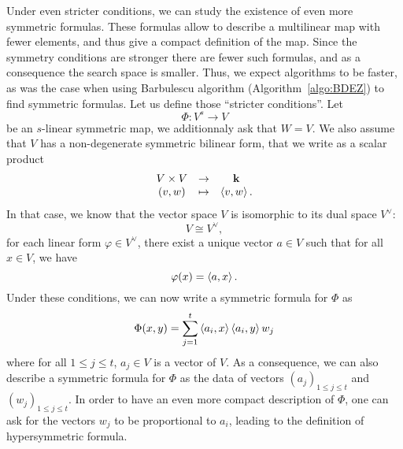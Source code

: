 Under even stricter conditions, we can study the existence of even more
symmetric formulas. These formulas allow to describe a multilinear map with
fewer elements, and thus give a compact definition of the map. Since the
symmetry conditions are stronger there are fewer such formulas, and as a
consequence the search space is smaller. Thus, we expect algorithms to be
faster, as was the case when using Barbulescu \etal algorithm
(Algorithm~\ref{algo:BDEZ}) to find symmetric formulas. Let us define those
``stricter conditions''. Let
\[
  \Phi:V^s\to V
\]
be an $s$-linear symmetric map, \ie we additionnaly ask that $W=V$. We also
assume that $V$ has a non-degenerate symmetric bilinear form, that we write as a
scalar product
\[
 \begin{array}{ccc}
 V\times V &\to&\mathbf{k}\\
 (v,w)&\mapsto&\left\langle v,w\right\rangle.
 \end{array}
\]
In that case, we know that the vector space $V$ is isomorphic to its dual space
$V^\vee$:
\[
  V\cong V^\vee,
\]
\ie for each linear form $\varphi\in V^\vee$, there exist a unique vector $a\in
V$ such that for all $x\in V$, we have
\[
  \varphi(x) = \left\langle a,x\right\rangle.
\]
Under these conditions, we can now write a symmetric formula for $\Phi$ as
\[
  \Phi(x, y) = \sum_{j=1}^t\left\langle a_i,x\right\rangle\left\langle a_i,y\right\rangle w_j
\]
where for all $1\leq j\leq t$, $a_j\in V$ is a vector of $V$. As a consequence,
we can also describe a symmetric formula for $\Phi$ as the data of vectors
$(a_j)_{1\leq j\leq t}$ and $(w_j)_{1\leq j\leq t}$. In order to have an even
more compact description of $\Phi$, one can ask for the vectors $w_j$ to be
proportional to $a_i$, leading to the definition of hypersymmetric
formula.
%
%
%

